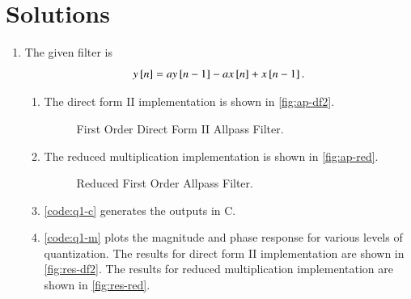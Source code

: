 \documentclass[journal,12pt,twocolumn]{IEEEtran}
\begin{document}
\section{Solutions}

\begin{enumerate}
    \item The given filter is
    \begin{equation}
        y{}\left[n\right] = ay{}\left[n-1\right] - ax{}\left[n\right] + x{}\left[n-1\right].
        \label{eq:ap-filter}
    \end{equation}
    \begin{enumerate}
        \item The direct form II implementation is shown in
        \autoref{fig:ap-df2}.
            
            \begin{figure}[!ht]
                \centering
                
                \caption{First Order Direct Form II Allpass Filter.}
                \label{fig:ap-df2}
            \end{figure}
        
        \item The reduced multiplication implementation is shown in \autoref{fig:ap-red}.

            \begin{figure}[!ht]
                \centering
                
                \caption{Reduced First Order Allpass Filter.}
                \label{fig:ap-red}
            \end{figure}

        \item \autoref{code:q1-c} generates the outputs in C.

        \item \autoref{code:q1-m} plots the magnitude and phase response for
        various levels of quantization. The results for direct form II
        implementation are shown in \autoref{fig:res-df2}. The results for
        reduced multiplication implementation are shown in
        \autoref{fig:res-red}.


\end{enumerate}
\end{enumerate}
\end{document}
